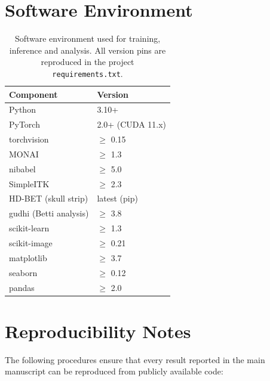 \documentclass[10pt,a4paper]{article}
\begin{document}
\section{Software Environment}

\begin{table}[!ht]
\caption{Software environment used for training, inference and
analysis. All version pins are reproduced in the project
\texttt{requirements.txt}.}
\centering
\small
\begin{tabular}{ll}
\toprule
Component & Version \\
\midrule
Python                  & 3.10+ \\
PyTorch                 & 2.0+ (CUDA 11.x) \\
torchvision             & $\geq$ 0.15 \\
MONAI                   & $\geq$ 1.3 \\
nibabel                 & $\geq$ 5.0 \\
SimpleITK               & $\geq$ 2.3 \\
HD-BET (skull strip)    & latest (pip) \\
gudhi (Betti analysis)  & $\geq$ 3.8 \\
scikit-learn            & $\geq$ 1.3 \\
scikit-image            & $\geq$ 0.21 \\
matplotlib              & $\geq$ 3.7 \\
seaborn                 & $\geq$ 0.12 \\
pandas                  & $\geq$ 2.0 \\
\bottomrule
\end{tabular}
\end{table}

\section{Reproducibility Notes}

The following procedures ensure that every result reported in the
main manuscript can be reproduced from publicly available code:
\end{document}
